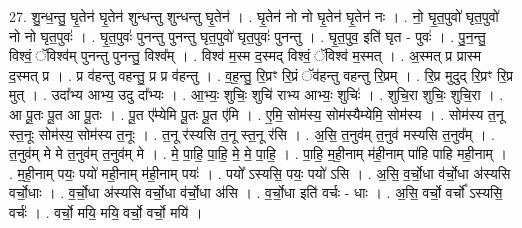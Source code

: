 \documentclass[17pt]{extarticle}
\begin{document}
27. शु॒न्ध॒न्तु॒ घृ॒तेन॑ घृ॒तेन॑ शुन्धन्तु शुन्धन्तु घृ॒तेन॑ । . घृ॒तेन॑ नो नो घृ॒तेन॑ घृ॒तेन॑ नः । . नो॒ घृ॒त॒पुवो॑ घृत॒पुवो॑ नो नो घृत॒पुवः॑ । . घृ॒त॒पुवः॑ पुनन्तु पुनन्तु घृत॒पुवो॑ घृत॒पुवः॑ पुनन्तु । . घृ॒त॒पुव॒ इति॑ घृत - पुवः॑ । . पु॒न॒न्तु॒ विश्वं॒ ॅविश्व॑म् पुनन्तु पुनन्तु॒ विश्व᳚म् । . विश्व॑ म॒स्म द॒स्मद् विश्वं॒ ॅविश्व॑ म॒स्मत् । . अ॒स्मत् प्र प्रास्म द॒स्मत् प्र । . प्र व॑हन्तु वहन्तु॒ प्र प्र व॑हन्तु । . व॒ह॒न्तु॒ रि॒प्रꣳ रि॒प्रं ॅव॑हन्तु वहन्तु रि॒प्रम् । . रि॒प्र मुदुद् रि॒प्रꣳ रि॒प्र मुत् । . उदा᳚भ्य आभ्य॒ उदु दा᳚भ्यः । . आ॒भ्यः॒ शुचिः॒ शुचि॑ राभ्य आभ्यः॒ शुचिः॑ । . शुचि॒रा शुचिः॒ शुचि॒रा । . आ पू॒तः पू॒त आ पू॒तः । . पू॒त ए᳚म्येमि पू॒तः पू॒त ए॑मि । . ए॒मि॒ सोम॑स्य॒ सोम॑स्यैम्येमि॒ सोम॑स्य । . सोम॑स्य त॒नू स्त॒नूः सोम॑स्य॒ सोम॑स्य त॒नूः । . त॒नू र॑स्यसि त॒नू स्त॒नू र॑सि । . अ॒सि॒ त॒नुव॑म् त॒नुव॑ मस्यसि त॒नुव᳚म् । . त॒नुव॑म् मे मे त॒नुव॑म् त॒नुव॑म् मे । . मे॒ पा॒हि॒ पा॒हि॒ मे॒ मे॒ पा॒हि॒ । . पा॒हि॒ म॒ही॒नाम् म॑ही॒नाम् पा॑हि पाहि मही॒नाम् । . म॒ही॒नाम् पयः॒ पयो॑ मही॒नाम् म॑ही॒नाम् पयः॑ । . पयो᳚ ऽस्यसि॒ पयः॒ पयो॑ ऽसि । . अ॒सि॒ व॒र्चो॒धा व॑र्चो॒धा अ॑स्यसि वर्चो॒धाः । . व॒र्चो॒धा अ॑स्यसि वर्चो॒धा व॑र्चो॒धा अ॑सि । . व॒र्चो॒धा इति॑ वर्चः - धाः । . अ॒सि॒ वर्चो॒ वर्चो᳚ ऽस्यसि॒ वर्चः॑ । . वर्चो॒ मयि॒ मयि॒ वर्चो॒ वर्चो॒ मयि॑ । \newline
\end{document}
